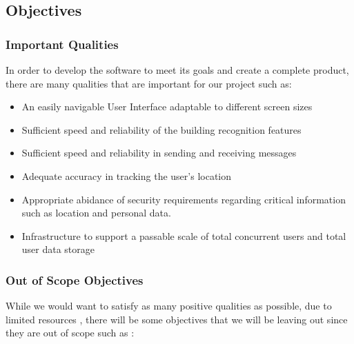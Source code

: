 \documentclass[12pt, titlepage]{article}
\begin{document}
 

\subsection{Objectives}

\subsubsection{Important Qualities}
In order to develop the software to meet its goals and create a complete product, there are many qualities that are important for our project such as:

\begin{itemize}
    \item An easily navigable User Interface adaptable to different screen sizes

    \item Sufficient speed and reliability of the building recognition features

    \item Sufficient speed and reliability in sending and receiving messages

    \item Adequate accuracy in tracking the user's location

    \item Appropriate abidance of security requirements regarding critical information such as location and personal data.

    \item Infrastructure to support a passable scale of total concurrent users and total user data storage
    \end{itemize}


\subsubsection{Out of Scope Objectives}
While we would want to satisfy as many positive qualities as possible, due to limited resources , there will be some objectives that we will be leaving out since they are out of scope such as :
\end{document}
